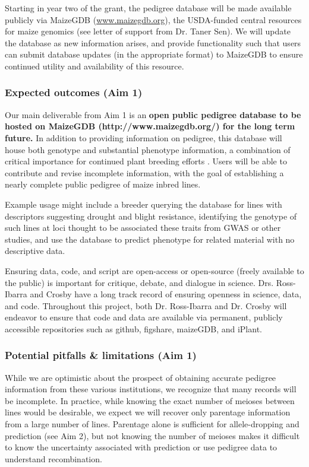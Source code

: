 \documentclass[12pt]{article}
\begin{document}
Starting in year two of the grant, the pedigree database will be made available publicly via MaizeGDB (\url{www.maizegdb.org}), the USDA-funded central resources for maize genomics (see letter of support from Dr. Taner Sen).
We will update the database as new information arises, and provide functionality such that users can submit database updates (in the appropriate format) to MaizeGDB to ensure continued utility and availability of this resource.

\subsubsection*{Expected outcomes (Aim 1)}
Our main deliverable from Aim 1 is an \textbf{open public pedigree database to be hosted on MaizeGDB (http://www.maizegdb.org/) for the long term future.} 
In addition to providing information on pedigree, this database will house both genotype and substantial phenotype information, a combination of critical importance for continued plant breeding efforts \citep{zamir2013have}.
Users will be able to contribute and revise incomplete information, with the goal of establishing a nearly complete public pedigree of maize inbred lines.   

Example usage might include a breeder querying the database for lines with descriptors suggesting drought and blight resistance, identifying the genotype of such lines at loci thought to be associated these traits from GWAS or other studies, and use the database to predict phenotype for related material with no descriptive data.

Ensuring data, code, and script are open-access or open-source (freely available to the public) is important for critique, debate, and dialogue in science. 
Drs. Ross-Ibarra and Crosby have a long track record of ensuring openness in science, data, and code. Throughout this project, both Dr. Ross-Ibarra and Dr. Crosby will endeavor to ensure that code and data are available via permanent, publicly accessible repositories such as github, figshare, maizeGDB, and iPlant.

\subsubsection*{Potential pitfalls \& limitations (Aim 1)}

While we are optimistic about the prospect of obtaining accurate pedigree information from these various institutions, we recognize that many records will be incomplete. 
In practice, while knowing the exact number of meioses between lines would be desirable, we expect we will recover only parentage information from a large number of lines. 
Parentage alone is sufficient for allele-dropping and prediction (see Aim 2), but not knowing the number of meioses makes it difficult to know the uncertainty associated with prediction or use pedigree data to understand recombination.
 
\end{document}

